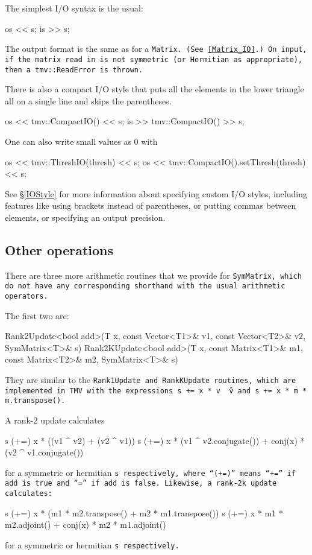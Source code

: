 The simplest I/O syntax is the usual:
\begin{tmvcode}
os << s;
is >> s;
\end{tmvcode}
The output format is the same as for a \tt{Matrix}.
(See \ref{Matrix_IO}.)  On input, if the matrix read in is not symmetric (or Hermitian as appropriate), then a \tt{tmv::ReadError} is thrown.  

There is also a compact I/O style that puts all the elements in the lower triangle all on a single line and skips the parentheses. 
\begin{tmvcode}
os << tmv::CompactIO() << s;
is >> tmv::CompactIO() >> s;
\end{tmvcode}

One can also write small values as 0 with
\begin{tmvcode}
os << tmv::ThreshIO(thresh) << s;
os << tmv::CompactIO().setThresh(thresh) << s;
\end{tmvcode}

See \S\ref{IOStyle} for more information about specifying custom I/O styles, including
features like using brackets instead of parentheses, or putting commas between elements,
or specifying an output precision.  

\subsection{Other operations}
\label{SymMatrix_Ops}

There are three more arithmetic routines that we provide for \tt{SymMatrix},
which do not have
any corresponding shorthand with the usual arithmetic operators.

The first two are:
\begin{tmvcode}
Rank2Update<bool add>(T x, const Vector<T1>& v1, const Vector<T2>& v2, 
      SymMatrix<T>& s)
Rank2KUpdate<bool add>(T x, const Matrix<T1>& m1, const Matrix<T2>& m2,
      SymMatrix<T>& s)
\end{tmvcode}
They are similar to the \tt{Rank1Update} and \tt{RankKUpdate} routines,
which are implemented in TMV with the expressions 
\tt{s += x * v \^\ v} and \tt{s += x * m * m.transpose()}.

A rank-2 update calculates
\begin{tmvcode}
s (+=) x * ((v1 ^ v2) + (v2 ^ v1))
s (+=) x * (v1 ^ v2.conjugate()) + conj(x) * (v2 ^ v1.conjugate())
\end{tmvcode}
for a symmetric or hermitian \tt{s} respectively,
where ``(+=)'' means ``+='' if \tt{add} is \tt{true} and ``='' 
if \tt{add} is \tt{false}.
Likewise, a rank-2k update calculates:
\begin{tmvcode}
s (+=) x * (m1 * m2.transpose() + m2 * m1.transpose())
s (+=) x * m1 * m2.adjoint() + conj(x) * m2 * m1.adjoint()
\end{tmvcode}
for a symmetric or hermitian \tt{s} respectively.

